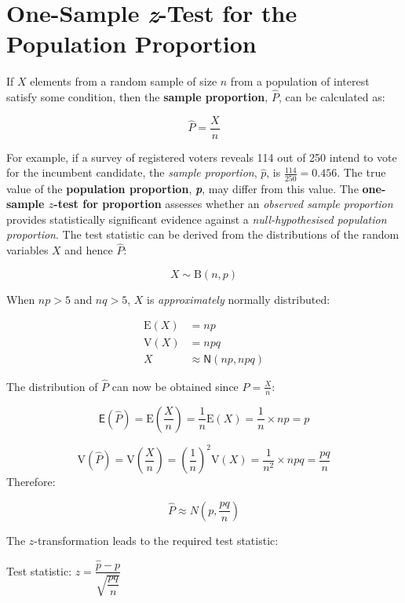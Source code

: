 \documentclass[
  11pt,
]{book}
\begin{document}
\section{\texorpdfstring{One-Sample \textit{z}-Test for the Population Proportion}{One-Sample -Test for the Population Proportion}}\label{one-sample--test-for-the-population-proportion}

If \(X\) elements from a random sample of size \(n\) from a population of interest satisfy some condition, then the \textbf{sample proportion}, \(\hat{P}\), can be calculated as:

\[\hat{P}=\frac{X}{n}\]

For example, if a survey of registered voters reveals 114 out of 250 intend to vote for the incumbent candidate, the \emph{sample proportion}, \(\hat{p}\), is \(\frac{\text{114}}{\text{250}}=\text{0.456}\). The true value of the \textbf{population proportion}, \textbf{\emph{p}}, may differ from this value. The \textbf{one-sample \(z\)-test for proportion} assesses whether an \emph{observed sample proportion} provides statistically significant evidence against a \emph{null-hypothesised population proportion}. The test statistic can be derived from the distributions of the random variables \(X\) and hence \(\hat{P}\):

\[X \sim \text{B}(n,p)\]

When \(np>\text{5}\) and \(nq>\text{5}\), \(X\) is \emph{approximately} normally distributed:

\begin{align*}
\text{E}(X) & = np\\
\text{V}(X) & = npq\\
X & \approx \mathsf{N}(np,npq)
\end{align*}

The distribution of \(\hat{P}\) can now be obtained since \(\hat{P}=\frac{X}{n}\):

\[\mathsf{E}\left(\hat{P}\right)=\text{E}\left(\frac{X}{n}\right)=\frac{\text{1}}{n}\text{E}(X)=\frac{\text{1}}{n}\times np=p\]

\[\text{V}\left(\hat{P}\right)=\text{V}\left(\frac{X}{n}\right)=\left(\frac{1}{n}\right)^\text{2} \text{V}(X)=\frac{\text{1}}{n^\text{2}}\times npq=\frac{pq}{n}\]
Therefore:

\[\hat{P} \approx N\left(p,\frac{pq}{n}\right)\]

The \(z\)-transformation leads to the required test statistic:

\begin{centering}
\begin{tcolorbox}[adjusted title=For a one-sample $z$-test for the population proportion:, halign title = center,colback=red!5,colframe=red!70!black, halign = center]
Test statistic: $z=\dfrac{\hat{p}-p}{\sqrt{\dfrac{pq}{n}}}$
\end{tcolorbox}
\end{centering}
\end{document}
